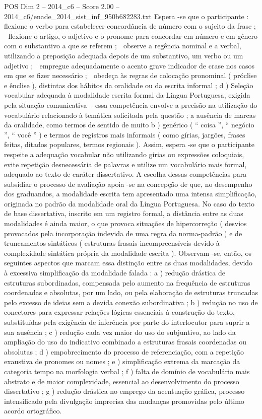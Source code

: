 \begin{textsample}{POS Dim 2 – 2014\_c6 – Score 2.00 – 2014\_c6/enade\_2014\_sist\_inf\_950b682283.txt}
Espera -se que o participante :  flexione o verbo para estabelecer concordância de número com o sujeito da frase ;  flexione o artigo, o adjetivo e o pronome para concordar em número e em gênero com o substantivo a que se referem ;  observe a regência nominal e a verbal, utilizando a preposição adequada depois de um substantivo, um verbo ou um adjetivo ;  empregue adequadamente o acento grave indicador de crase nos casos em que se fizer necessário ;  obedeça às regras de colocação pronominal ( próclise e ênclise ), distintas dos hábitos da oralidade ou da escrita informal ; d ) Seleção vocabular adequada à modalidade escrita formal da Língua Portuguesa, exigida pela situação comunicativa – essa competência envolve a precisão na utilização do vocabulário relacionado à temática solicitada pela questão ; a ausência de marcas da oralidade, como termos de sentido de muito b ) genérico ( “ coisa ”, “ negócio ”, “ você ” ) e termos de registros mais informais ( como gírias, jargões, frases feitas, ditados populares, termos regionais ).
Assim, espera -se que o participante respeite a adequação vocabular não utilizando gírias ou expressões coloquiais, evite repetição desnecessária de palavras e utilize um vocabulário mais formal, adequado ao texto de caráter dissertativo.
A escolha dessas competências para subsidiar o processo de avaliação apoia -se na concepção de que, no desempenho dos graduandos, a modalidade escrita tem apresentado uma intensa simplificação, originada no padrão da modalidade oral da Língua Portuguesa.
No caso do texto de base dissertativa, inscrito em um registro formal, a distância entre as duas modalidades é ainda maior, o que provoca situações de hipercorreção ( desvios provocados pela incorporação indevida de uma regra da norma-padrão ) e de truncamentos sintáticos ( estruturas frasais incompreensíveis devido à complexidade sintática própria da modalidade escrita ).
Observam -se, então, os seguintes aspectos que marcam essa distinção entre as duas modalidades, devido à excessiva simplificação da modalidade falada : a ) redução drástica de estruturas subordinadas, compensada pelo aumento na frequência de estruturas coordenadas e absolutas, por um lado, ou pela elaboração de estruturas truncadas pelo excesso de ideias sem a devida conexão subordinativa ; b ) redução no uso de conectores para expressar relações lógicas essenciais à construção do texto, substituídas pela exigência de inferência por parte do interlocutor para suprir a sua ausência ; c ) redução cada vez maior do uso do subjuntivo, ao lado da ampliação do uso do indicativo combinado a estruturas frasais coordenadas ou absolutas ; d ) empobrecimento do processo de referenciação, com a repetição exaustiva de pronomes ou nomes ; e ) simplificação extrema da marcação da categoria tempo na morfologia verbal ; f ) falta de domínio de vocabulário mais abstrato e de maior complexidade, essencial ao desenvolvimento do processo dissertativo ; g ) redução drástica no emprego da acentuação gráfica, processo intensificado pela divulgação imprecisa das mudanças promovidas pelo último acordo ortográfico.

\end{textsample}
